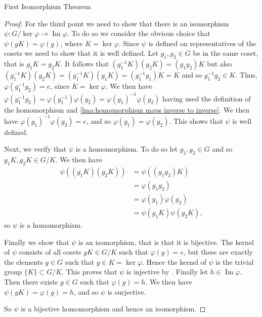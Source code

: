 \documentclass[fleqn]{NotesClass}
\newcommand{\subgroup}{\subset}
\DeclareMathOperator{\image}{Im}
\begin{document}
\begin{thm}{First Isomorphism Theorem}{}
\begin{proof}
            For the third point we need to show that there is an isomorphism \(\psi\colon G/\ker\varphi \to \image \varphi\).
            To do so we consider the obvious choice that \(\psi(gK) = \varphi(g)\), where \(K = \ker\varphi\).
            Since \(\psi\) is defined on representatives of the cosets we need to show that it is well defined.
            Let \(g_1, g_2 \in G\) be in the same coset, that is \(g_1K = g_2K\).
            It follows that \((g_1^{-1}K)(g_2K) = (g_1g_2)K\) but also \((g_1^{-1}K)(g_2K) = (g_1^{-1}K)(g_1K) = (g_1^{-1}g_1)K = K\) and so \(g_1^{-1}g_2 \in K\).
            Thus, \(\varphi(g_1^{-1}g_2) = e\), since \(K = \ker\varphi\).
            We then have \(\varphi(g_1^{-1}g_2) = \varphi(g_1^{-1})\varphi(g_2) = \varphi(g_1)^{-1}\varphi(g_2)\) having used the definition of the homomorphism and \cref{lma:homomorphism maps inverse to inverse}.
            We then have \(\varphi(g_1)^{-1}\varphi(g_2) = e\), and so \(\varphi(g_1) = \varphi(g_2)\).
            This shows that \(\psi\) is well defined.
            
            Next, we verify that \(\psi\) is a homomorphism.
            To do so let \(g_1, g_2 \in G\) and so \(g_1K, g_2K \in G/K\).
            We then have
            \begin{align}
                \psi((g_1K)(g_2K)) &= \psi((g_1g_2)K)\\
                &= \varphi(g_1g_2)\\
                &= \varphi(g_1)\varphi(g_2)\\
                &= \psi(g_1K)\psi(g_2K),
            \end{align}
            so \(\psi\) is a homomorphism.
            
            Finally we show that \(\psi\) is an isomorphism, that is that it is bijective.
            The kernel of \(\psi\) consists of all cosets \(gK \in G/K\) such that \(\varphi(g) = e\), but these are exactly the elements \(g \in G\) such that \(g \in K = \ker\varphi\).
            Hence the kernel of \(\psi\) is the trivial group \(\{K\} \subgroup G/K\).
            This proves that \(\psi\) is injective by . %
            Finally let \(h \in \image \varphi\).
            Then there exists \(g \in G\) such that \(\varphi(g) = h\).
            We then have \(\psi(gK) = \varphi(g) = h\), and so \(\psi\) is surjective.
            
            So \(\psi\) is a bijective homomorphism and hence an isomorphism.
        \end{proof}
    \end{thm}
\end{document}
